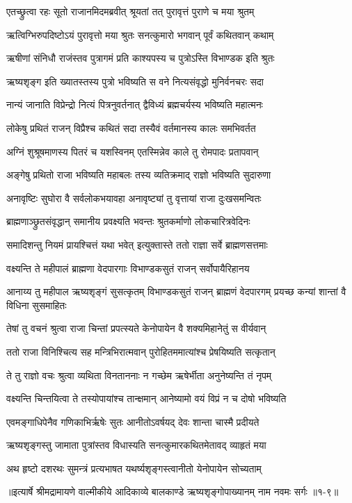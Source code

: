 
\twolineshloka
{एतच्छ्रुत्वा रहः सूतो राजानमिदमब्रवीत्}
{श्रूयतां तत् पुरावृत्तं पुराणे च मया श्रुतम्} %

\twolineshloka
{ऋत्विग्भिरुपदिष्टोऽयं पुरावृत्तो मया श्रुतः}
{सनत्कुमारो भगवान् पूर्वं कथितवान् कथाम्} %

\twolineshloka
{ऋषीणां संनिधौ राजंस्तव पुत्रागमं प्रति}
{काश्यपस्य च पुत्रोऽस्ति विभाण्डक इति श्रुतः} %

\twolineshloka
{ऋष्यशृङ्ग इति ख्यातस्तस्य पुत्रो भविष्यति}
{स वने नित्यसंवृद्धो मुनिर्वनचरः सदा} %

\twolineshloka
{नान्यं जानाति विप्रेन्द्रो नित्यं पित्रनुवर्तनात्}
{द्वैविध्यं ब्रह्मचर्यस्य भविष्यति महात्मनः} %

\twolineshloka
{लोकेषु प्रथितं राजन् विप्रैश्च कथितं सदा}
{तस्यैवं वर्तमानस्य कालः समभिवर्तत} %

\twolineshloka
{अग्निं शुश्रूषमाणस्य पितरं च यशस्विनम्}
{एतस्मिन्नेव काले तु रोमपादः प्रतापवान्} %

\twolineshloka
{अङ्गेषु प्रथितो राजा भविष्यति महाबलः}
{तस्य व्यतिक्रमाद् राज्ञो भविष्यति सुदारुणा} %

\twolineshloka
{अनावृष्टिः सुघोरा वै सर्वलोकभयावहा}
{अनावृष्ट्यां तु वृत्तायां राजा दुःखसमन्वितः} %

\twolineshloka
{ब्राह्मणाञ्छ्रुतसंवृद्धान् समानीय प्रवक्ष्यति}
{भवन्तः श्रुतकर्माणो लोकचारित्रवेदिनः} %

\twolineshloka
{समादिशन्तु नियमं प्रायश्चित्तं यथा भवेत्}
{इत्युक्तास्ते ततो राज्ञा सर्वे ब्राह्मणसत्तमाः} %

\twolineshloka
{वक्ष्यन्ति ते महीपालं ब्राह्मणा वेदपारगाः}
{विभाण्डकसुतं राजन् सर्वोपायैरिहानय} %

\threelineshloka
{आनाय्य तु महीपाल ऋष्यशृङ्गं सुसत्कृतम्}
{विभाण्डकसुतं राजन् ब्राह्मणं वेदपारगम्}
{प्रयच्छ कन्यां शान्तां वै विधिना सुसमाहितः} %

\twolineshloka
{तेषां तु वचनं श्रुत्वा राजा चिन्तां प्रपत्स्यते}
{केनोपायेन वै शक्यमिहानेतुं स वीर्यवान्} %

\twolineshloka
{ततो राजा विनिश्चित्य सह मन्त्रिभिरात्मवान्}
{पुरोहितममात्यांश्च प्रेषयिष्यति सत्कृतान्} %

\twolineshloka
{ते तु राज्ञो वचः श्रुत्वा व्यथिता विनताननाः}
{न गच्छेम ऋषेर्भीता अनुनेष्यन्ति तं नृपम्} %

\twolineshloka
{वक्ष्यन्ति चिन्तयित्वा ते तस्योपायांश्च तान्क्षमान्}
{आनेष्यामो वयं विप्रं न च दोषो भविष्यति} %

\twolineshloka
{एवमङ्गाधिपेनैव गणिकाभिर्ऋषेः सुतः}
{आनीतोऽवर्षयद् देवः शान्ता चास्मै प्रदीयते} %

\twolineshloka
{ऋष्यशृङ्गस्तु जामाता पुत्रांस्तव विधास्यति}
{सनत्कुमारकथितमेतावद् व्याहृतं मया} %

\twolineshloka
{अथ हृष्टो दशरथः सुमन्त्रं प्रत्यभाषत}
{यथर्ष्यशृङ्गस्त्वानीतो येनोपायेन सोच्यताम्} %


॥इत्यार्षे श्रीमद्रामायणे वाल्मीकीये आदिकाव्ये बालकाण्डे ऋष्यशृङ्गोपाख्यानम् नाम नवमः सर्गः ॥१-९॥
